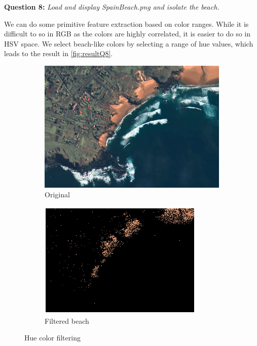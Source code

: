 

\textbf{Question 8:}
\textit{Load and display SpainBeach.png and isolate the beach.}

We can do some primitive feature extraction based on color ranges. While it is difficult to so in RGB as the colors are highly correlated, it is easier to do so in HSV space. We select beach-like colors by selecting a range of hue values, which leads to the result in \autoref{fig:resultQ8}.
\begin{figure}[!ht]
    \centering
    \begin{subfigure}{0.49\textwidth}
        \centering
        \includegraphics[width=\textwidth]{BE1_IntroComputerVision/SpainBeach.jpg}
        \caption{Original}
    \end{subfigure}
    \hfill
    \begin{subfigure}{0.49\textwidth}
        \centering
        \includegraphics[width=\textwidth]{Doc/Graphics/Part1/Q8_FilteredBeach.png}
        \caption{Filtered beach}
    \end{subfigure}
    \caption{Hue color filtering}
    \label{fig:resultQ8}
\end{figure}


